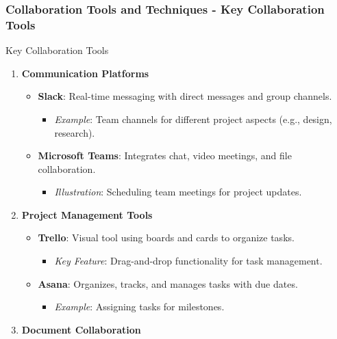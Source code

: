 \documentclass[aspectratio=169]{beamer}
\begin{document}
\begin{frame}[fragile]
    \frametitle{Collaboration Tools and Techniques - Key Collaboration Tools}
    \begin{block}{Key Collaboration Tools}
        \begin{enumerate}
            \item \textbf{Communication Platforms}
                \begin{itemize}
                    \item \textbf{Slack}: Real-time messaging with direct messages and group channels.
                          \begin{itemize}
                              \item \textit{Example}: Team channels for different project aspects (e.g., design, research).
                          \end{itemize}
                    \item \textbf{Microsoft Teams}: Integrates chat, video meetings, and file collaboration.
                          \begin{itemize}
                              \item \textit{Illustration}: Scheduling team meetings for project updates.
                          \end{itemize}
                \end{itemize}
            \item \textbf{Project Management Tools}
                \begin{itemize}
                    \item \textbf{Trello}: Visual tool using boards and cards to organize tasks.
                          \begin{itemize}
                              \item \textit{Key Feature}: Drag-and-drop functionality for task management.
                          \end{itemize}
                    \item \textbf{Asana}: Organizes, tracks, and manages tasks with due dates.
                          \begin{itemize}
                              \item \textit{Example}: Assigning tasks for milestones.
                          \end{itemize}
                \end{itemize}
            \item \textbf{Document Collaboration}

\end{enumerate}
\end{block}
\end{frame}
\end{document}

